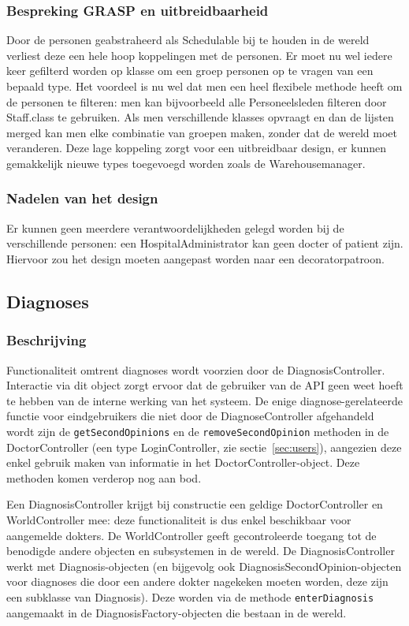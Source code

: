 \documentclass[a4paper]{article}
\begin{document}
\subsubsection{Bespreking GRASP en uitbreidbaarheid}
Door de personen geabstraheerd als Schedulable bij te houden in de wereld verliest deze een hele hoop koppelingen met de personen. Er moet nu wel iedere keer gefilterd worden op klasse om een groep personen op te vragen van een bepaald type. Het voordeel is nu wel dat men een heel flexibele methode heeft om de personen te filteren: men kan bijvoorbeeld alle Personeelsleden filteren door Staff.class te gebruiken. Als men verschillende klasses opvraagt en dan de lijsten merged kan men elke combinatie van groepen maken, zonder dat de wereld moet veranderen. Deze lage koppeling zorgt voor een uitbreidbaar design, er kunnen gemakkelijk nieuwe types toegevoegd worden zoals de Warehousemanager.

\subsubsection{Nadelen van het design}
Er kunnen geen meerdere verantwoordelijkheden gelegd worden bij de verschillende personen: een HospitalAdministrator kan geen docter of patient zijn. Hiervoor zou het design moeten aangepast worden naar een decoratorpatroon.

\subsection{Diagnoses \label{sec:diagnosis}}
\subsubsection{Beschrijving}
Functionaliteit omtrent diagnoses wordt voorzien door de DiagnosisController. Interactie via dit object zorgt ervoor dat de gebruiker van de API geen weet hoeft te hebben van de interne werking van het systeem. De enige diagnose-gerelateerde functie voor eindgebruikers die niet door de DiagnoseController afgehandeld wordt zijn de \texttt{getSecondOpinions} en de \texttt{removeSecondOpinion} methoden in de DoctorController (een type LoginController, zie sectie~\ref{sec:users}), aangezien deze enkel gebruik maken van informatie in het DoctorController-object. Deze methoden komen verderop nog aan bod.

Een DiagnosisController krijgt bij constructie een geldige DoctorController en WorldController mee: deze functionaliteit is dus enkel beschikbaar voor aangemelde dokters. De WorldController geeft gecontroleerde toegang tot de benodigde andere objecten en subsystemen in de wereld.
De DiagnosisController werkt met Diagnosis-objecten (en bijgevolg ook DiagnosisSecondOpinion-objecten voor diagnoses die door een andere dokter nagekeken moeten worden, deze zijn een subklasse van Diagnosis). Deze worden  via de methode \texttt{enterDiagnosis} aangemaakt in de DiagnosisFactory-objecten die bestaan in de wereld.
\end{document}
